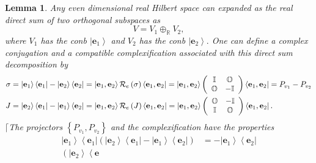 \documentclass[aps,preprint]{revtex4}
\newtheorem{lemma}[theorem]{Lemma}
\begin{document}
\begin{lemma}
Any even dimensional real Hilbert space can expanded as the real direct sum
of two orthogonal subspaces as 
\begin{equation}
V=V_{1}\oplus _{\mathbb{R}}V_{2},
\end{equation}%
where $V_{1}$ has the conb $\left\vert \mathbf{e}_{1}\right\rangle $ and $%
V_{2}$ has the conb $\left\vert \mathbf{e}_{2}\right\rangle .$ One can
define a complex conjugation and a compatible complexification associated
with this direct sum decomposition by 
\begin{align}
\sigma & =\left\vert \mathbf{e}_{1}\right\rangle \left\langle \mathbf{e}%
_{1}\right\vert -\left\vert \mathbf{e}_{2}\right\rangle \left\langle \mathbf{%
e}_{2}\right\vert =\left\vert \mathbf{e}_{1},\mathbf{e}_{2}\right\rangle 
\mathcal{R}_{e}\left( \sigma \right) \left\langle \mathbf{e}_{1},\mathbf{e}%
_{2}\right\vert =\left\vert \mathbf{e}_{1},\mathbf{e}_{2}\right\rangle
\left( 
\begin{array}{cc}
\mathbb{I} & \mathbb{O} \\ 
\mathbb{O} & -\mathbb{I}%
\end{array}%
\right) \left\langle \mathbf{e}_{1},\mathbf{e}_{2}\right\vert
=P_{v_{1}}-P_{v_{2}} \\
J& =\left\vert \mathbf{e}_{2}\right\rangle \left\langle \mathbf{e}%
_{1}\right\vert -\left\vert \mathbf{e}_{1}\right\rangle \left\langle \mathbf{%
e}_{2}\right\vert =\left\vert \mathbf{e}_{1},\mathbf{e}_{2}\right\rangle 
\mathcal{R}_{e}\left( J\right) \left\langle \mathbf{e}_{1},\mathbf{e}%
_{2}\right\vert =\left\vert \mathbf{e}_{1},\mathbf{e}_{2}\right\rangle
\left( 
\begin{array}{cc}
\mathbb{O} & -\mathbb{I} \\ 
\mathbb{I} & \mathbb{O}%
\end{array}%
\right) \left\langle \mathbf{e}_{1},\mathbf{e}_{2}\right\vert .
\end{align}%
$\lceil $The projectors $\left\{ P_{v_{1}},P_{v_{2}}\right\} $ and the
complexification have the properties 
\begin{align}
\left\vert \mathbf{e}_{1}\right\rangle \left\langle \mathbf{e}%
_{1}\right\vert \left( \left\vert \mathbf{e}_{2}\right\rangle \left\langle 
\mathbf{e}_{1}\right\vert -\left\vert \mathbf{e}_{1}\right\rangle
\left\langle \mathbf{e}_{2}\right\vert \right) & =-\left\vert \mathbf{e}%
_{1}\right\rangle \left\langle \mathbf{e}_{2}\right\vert \\
\left( \left\vert \mathbf{e}_{2}\right\rangle \left\langle \mathbf{e}%

\end{align}
\end{lemma}
\end{document}
